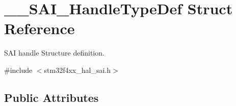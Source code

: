 \hypertarget{struct_____s_a_i___handle_type_def}{}\section{\+\_\+\+\_\+\+S\+A\+I\+\_\+\+Handle\+Type\+Def Struct Reference}
\label{struct_____s_a_i___handle_type_def}


S\+AI handle Structure definition.  




{\ttfamily \#include $<$stm32f4xx\+\_\+hal\+\_\+sai.\+h$>$}

\subsection*{Public Attributes}
